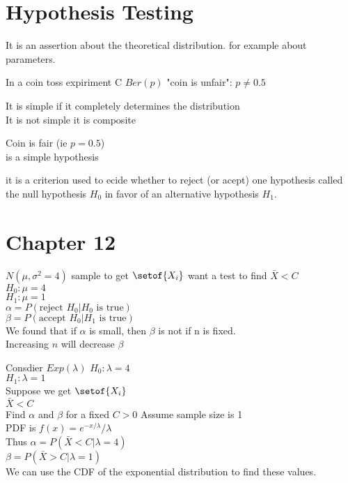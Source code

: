 \documentclass[answers,12pt,addpoints]{exam}
\begin{document}
\section*{Hypothesis Testing}
\begin{definition}
    It is an assertion about the theoretical distribution. for example about parameters.
    \begin{example}
        In a coin toss expiriment C $Ber(p)$ "coin is unfair": $p \neq 0.5$\\
    \end{example}
    It is simple if it completely determines the distribution\\
    It is not simple it is composite
\end{definition}
\begin{example}
    Coin is fair (ie $p = 0.5$)\\
    is a simple hypothesis
\end{example}
\begin{definition}
    it is a criterion used to ecide whether to reject (or acept) one hypothesis called the null hypothesis $H_0$ in favor of an alternative hypothesis $H_1$.
\end{definition}

\section*{Chapter 12}
\begin{example}
    $N( \mu , \sigma^2 = 4)$ sample to get $\setof{X_i}$ want a test to find $\bar{X} <C$\\
    $H_0: \mu = 4$\\
    $H_1: \mu = 1$\\
    $\alpha = P(\text{reject } H_0 | H_0 \text{ is true})$\\
    $\beta = P(\text{accept } H_0 | H_1 \text{ is true})$\\
    We found that if $\alpha$ is small, then $\beta$ is not if n is fixed. \\
    Increasing $n$ will decrease $\beta$\\
\end{example}
\begin{example}
    Consdier $Exp(\lambda)$ 
    $H_0: \lambda = 4$\\
    $H_1: \lambda = 1$\\
    Suppose we get $\setof{X_i}$\\
    $\bar{X} < C$\\
    Find $\alpha$ and $\beta$ for a fixed $C > 0$ Assume sample size is 1\\
    PDF is $f(x) =e^{-x/ \lambda} / \lambda $\\
    Thus $\alpha = P(\bar{X} < C | \lambda = 4)$\\
    $\beta = P(\bar{X} > C | \lambda = 1)$\\
    We can use the CDF of the exponential distribution to find these values.\\
    
\end{example}
\end{document}

